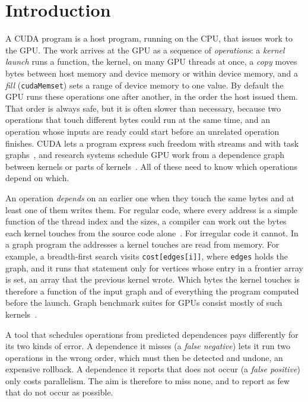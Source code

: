 \documentclass[11pt]{article}
\newcommand{\term}[1]{\emph{#1}}
\newcommand{\code}[1]{\texttt{#1}}
\begin{document}
\section{Introduction}
\label{sec:intro}

A CUDA program is a host program, running on the CPU, that issues work to the GPU. The work arrives at the GPU as
a sequence of \term{operations}: a \term{kernel launch} runs a function, the kernel, on many GPU threads at once,
a \term{copy} moves bytes between host memory and device memory or within device memory, and a \term{fill}
(\code{cudaMemset}) sets a range of device memory to one value. By default the GPU runs these operations one
after another, in the order the host issued them. That order is always safe, but it is often slower than
necessary, because two operations that touch different bytes could run at the same time, and an operation whose
inputs are ready could start before an unrelated operation finishes. CUDA lets a program express such freedom with
streams and with task graphs~\cite{cudaguide}, and research systems schedule GPU work from a dependence graph
between kernels or parts of kernels~\cite{Abdolrashidi2017Wireframe,Abdolrashidi2021BlockMaestro}. All of these
need to know which operations depend on which.

An operation \emph{depends} on an earlier one when they touch the same bytes and at least one of them writes them.
For regular code, where every address is a simple function of the thread index and the sizes, a compiler can work
out the bytes each kernel touches from the source code alone~\cite{Feautrier1991Dataflow}. For irregular code it
cannot. In a graph program the addresses a kernel touches are read from memory. For example, a breadth-first search
visits \code{cost[edges[i]]}, where \code{edges} holds the graph, and it runs that statement only for vertices whose
entry in a frontier array is set, an array that the previous kernel wrote. Which bytes the kernel touches is
therefore a function of the input graph and of everything the program computed before the launch. Graph
benchmark suites for GPUs consist mostly of such kernels~\cite{Che2013Pannotia,Burtscher2012Irregular,Wang2016Gunrock}.

A tool that schedules operations from predicted dependences pays differently for its two kinds of error. A
dependence it misses (a \term{false negative}) lets it run two operations in the wrong order, which must then be
detected and undone, an expensive rollback. A dependence it reports that does not occur (a \term{false positive})
only costs parallelism. The aim is therefore to miss none, and to report as few that do not occur as possible.
\end{document}
